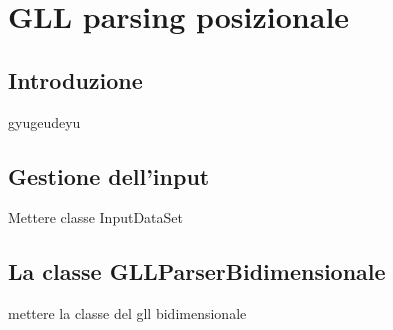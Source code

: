 \chapter{GLL parsing posizionale}
\section{Introduzione}
gyugeudeyu
\section{Gestione dell'input}
Mettere classe InputDataSet
\section{La classe GLLParserBidimensionale}
mettere la classe del gll bidimensionale